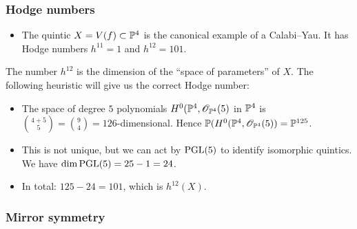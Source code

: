 \documentclass[UKenglish]{beamer}
\begin{document}
\begin{frame}
\frametitle{Hodge numbers}

\begin{itemize}
	\item The quintic $X=V(f) \subset \P^4$ is the canonical example of a Calabi--Yau. It has Hodge numbers $h^{11}=1$ and $h^{12}=101$.
\end{itemize}

\begin{remark}[Heuristic]
The number $h^{12}$ is the dimension of the ``space of parameters'' of $X$. The following heuristic will give us the correct Hodge number:
\begin{itemize}
	\item The space of degree $5$ polynomials $H^0(\P^4,\OO_{\P^4}(5)$ in $\P^4$ is $\binom{4+5}{5}=\binom{9}{4}=126$-dimensional. Hence $\P(H^0(\P^4,\OO_{\P^4}(5)) = \P^{125}$.
	\item This is not unique, but we can act by $\PGL(5)$ to identify isomorphic quintics. We have $\dim \PGL(5)=25-1=24$.
	\item In total: $125-24=101$, which is $h^{12}(X)$.
\end{itemize}
\end{remark}

\end{frame}


\begin{frame}
\frametitle{Mirror symmetry}


\end{frame}
\end{document}
